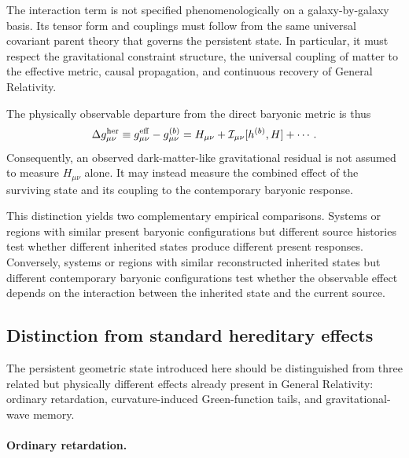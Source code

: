 The interaction term is not specified phenomenologically on a galaxy-by-galaxy
basis. Its tensor form and couplings must follow from the same universal
covariant parent theory that governs the persistent state. In particular, it
must respect the gravitational constraint structure, the universal coupling of
matter to the effective metric, causal propagation, and continuous recovery of
General Relativity.

The physically observable departure from the direct baryonic metric is thus
\begin{equation}
    \Delta g_{\mu\nu}^{\rm her}
    \equiv
    g_{\mu\nu}^{\rm eff}
    -
    g_{\mu\nu}^{(b)}
    =
    H_{\mu\nu}
    +
    \mathcal{I}_{\mu\nu}[h^{(b)},H]
    +
    \cdots .
    \label{eq:observable-hereditary-metric-residual}
\end{equation}
Consequently, an observed dark-matter-like gravitational residual is not assumed
to measure $H_{\mu\nu}$ alone. It may instead measure the combined effect of the
surviving state and its coupling to the contemporary baryonic response.

This distinction yields two complementary empirical comparisons. Systems or
regions with similar present baryonic configurations but different source
histories test whether different inherited states produce different present
responses. Conversely, systems or regions with similar reconstructed inherited
states but different contemporary baryonic configurations test whether the
observable effect depends on the interaction between the inherited state and
the current source.

\subsection{Distinction from standard hereditary effects}
\label{subsec:persistent-state-distinction}

The persistent geometric state introduced here should be distinguished from
three related but physically different effects already present in General
Relativity: ordinary retardation, curvature-induced Green-function tails, and
gravitational-wave memory.

\paragraph{Ordinary retardation.}

